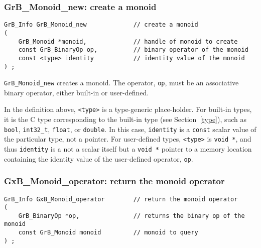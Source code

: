 \documentclass[12pt]{article}
\begin{document}
\subsubsection{{\sf GrB\_Monoid\_new:} create a monoid}
\label{monoid_new}

\begin{mdframed}[userdefinedwidth=6in]
{\footnotesize
\begin{verbatim}
GrB_Info GrB_Monoid_new             // create a monoid
(
    GrB_Monoid *monoid,             // handle of monoid to create
    const GrB_BinaryOp op,          // binary operator of the monoid
    const <type> identity           // identity value of the monoid
) ;
\end{verbatim}
} \end{mdframed}

\verb'GrB_Monoid_new' creates a monoid.  The operator, \verb'op', must be an
associative binary operator, either built-in or user-defined.

In the definition above, \verb'<type>' is a type-generic place-holder.  For
built-in types, it is the C type corresponding to the built-in type (see
Section~\ref{type}), such as \verb'bool', \verb'int32_t', \verb'float', or
\verb'double'.  In this case, \verb'identity' is a \verb'const' scalar value of
the particular type, not a pointer.  For user-defined types, \verb'<type>' is
\verb'void *', and thus \verb'identity' is a not a scalar itself but a
\verb'void *' pointer to a memory location containing the identity value of the
user-defined operator, \verb'op'.

\subsubsection{{\sf GxB\_Monoid\_operator:} return the monoid operator}
\label{monoid_operator}

\begin{mdframed}[userdefinedwidth=6in]
{\footnotesize
\begin{verbatim}
GrB_Info GxB_Monoid_operator        // return the monoid operator
(
    GrB_BinaryOp *op,               // returns the binary op of the monoid
    const GrB_Monoid monoid         // monoid to query
) ;
\end{verbatim}
} \end{mdframed}
\end{document}
